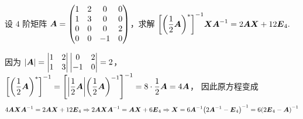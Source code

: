 \begin{example}
    设 $4$ 阶矩阵 $\vb*{A}=\begin{pmatrix}
            1 & 2 & 0  & 0 \\
            1 & 3 & 0  & 0 \\
            0 & 0 & 0  & 2 \\
            0 & 0 & -1 & 0
        \end{pmatrix}$，求解 $\qty[\qty(\dfrac{1}{2}\vb*{A})^*]^{-1}\vb*{XA}^{-1}=2\vb*{AX}+12\vb*{E}_4.$
\end{example}
\begin{solution}
    因为 $|\vb*{A}|=\begin{vmatrix}
            1 & 2 \\
            1 & 3
        \end{vmatrix}
        \begin{vmatrix}
            0  & 2 \\
            -1 & 0
        \end{vmatrix}=2$，$\qty[\qty(\dfrac{1}{2}\vb*{A})^*]^{-1}=\qty[\qty|\dfrac{1}{2}\vb*{A}|\qty(\dfrac{1}{2}\vb*{A})^{-1}]^{-1}=8\cdot \dfrac{1}{2}\vb*{A}=4\vb*{A}$，
    因此原方程变成 $$4\vb*{AXA}^{-1}=2\vb*{AX}+12\vb*{E}_4\Rightarrow 2\vb*{AXA}^{-1}=\vb*{AX}+6\vb*{E}_4\Rightarrow \vb*{X}=6\vb*{A}^{-1}\qty(2\vb*{A}^{-1}-\vb*{E}_4)^{-1}=6\qty(2\vb*{E}_4-\vb*{A})^{-1}$$
\end{solution}
